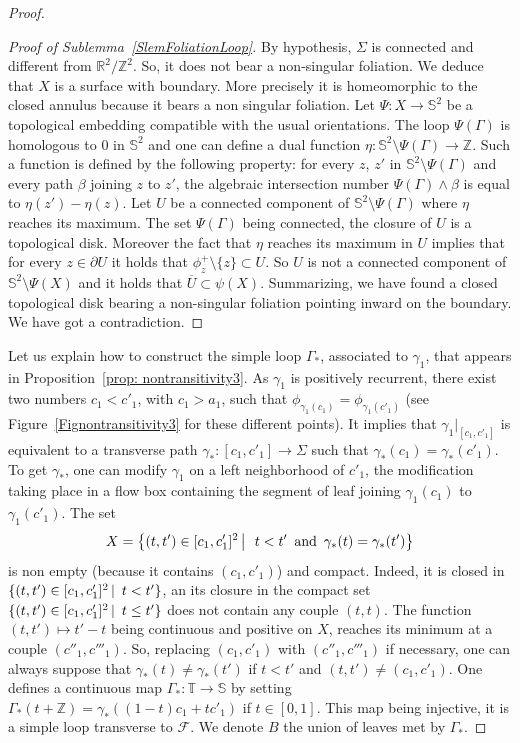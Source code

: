 \documentclass[10pt,a4paper]{article}
\theoremstyle{definition}
\theoremstyle{plain}
\numberwithin{equation}{section}
\numberwithin{figure}{section}
\newcommand{\R}{\mathbb{R}}
\newcommand{\Z}{\mathbb{Z}}
\newcommand{\T}{\mathbb{T}}
\renewcommand{\S}{\mathbb{S}}
\newcommand{\F}{\mathcal{F}}
\begin{document}
\begin{proof}
\begin{proof}[Proof of Sublemma~\ref{SlemFoliationLoop}]
By hypothesis, $\Sigma$ is connected and different from $\R^2/\Z^2$. So, it does not bear a non-singular foliation. We deduce that $X$ is a surface with boundary. More precisely it is homeomorphic to the closed annulus because it bears a non singular foliation. Let $\Psi: X\to\S^2$ be a topological embedding compatible with the usual orientations. The loop $\Psi(\Gamma)$ is homologous to $0$ in $\S^2$ and one can define a dual function $\eta:\S^2\setminus\Psi(\Gamma)\to\Z$. Such a function is defined by the following property: for every $z$, $z'$ in $\S^2\setminus\Psi(\Gamma)$ and every path $\beta$ joining $z$ to $z'$, the algebraic intersection number $\Psi(\Gamma)\wedge \beta$ is equal to $\eta(z')-\eta(z)$. Let $U$ be a connected component of $\S^2\setminus\Psi(\Gamma)$ where $\eta$ reaches its maximum. The set $\Psi(\Gamma)$ being connected, the closure of $U$ is a topological disk. Moreover the fact that $\eta$ reaches its maximum in $U$ implies that for every $z\in \partial U$ it holds that $\phi_z^+\setminus\{z\}\subset U$. So $U$ is not a connected component of $\S^2\setminus \Psi(X)$ and it holds that $\overline U\subset \psi(X)$. Summarizing, we have found a closed topological disk bearing a non-singular foliation pointing inward on the boundary. We have got a contradiction.
\end{proof}



Let us explain how to construct the simple loop $\Gamma_*$, associated to $\gamma_1$, that appears in Proposition~\ref{prop: nontransitivity3}. As $\gamma_1$ is positively recurrent, there exist two numbers $c_1<c'_1$, with $c_1>a_1$, such that $\phi_{\gamma_1(c_1)} = \phi_{\gamma_1(c'_1)}$ (see Figure~\ref{Fignontransitivity3} for these different points). It implies that $\gamma_1\vert_{[c_1,c'_1]}$ is equivalent to a transverse path $\gamma_* :[c_1,c'_1]\to\Sigma $ such that $\gamma_*(c_1) = \gamma_*(c'_1)$. To get $\gamma_*$, one can modify $\gamma_1$ on a left neighborhood of $c'_1$, the modification taking place in a flow box containing the segment of leaf joining $\gamma_1(c_1)$ to $\gamma_1(c'_1)$. The set
\[
X=\big\{(t,t')\in [c_1,c'_1]^2\,\big\vert\, \enskip t<t'\enskip\text{and}\enskip \gamma_*(t) = \gamma_*(t')\big\}
\]
is non empty (because it contains $(c_1,c'_1)$) and compact. Indeed, it is closed in $\{(t,t')\in [c_1,c'_1]^2\,\vert \enskip t<t'\}$, an its closure in the compact set $\{(t,t')\in [c_1,c'_1]^2\,\vert \enskip t\leq t'\}$ does not contain any couple $(t,t)$. The function $(t,t')\mapsto t'-t$ being continuous and positive on $X$, reaches its minimum at a couple $(c''_1,c'''_1)$. So, replacing $(c_1,c'_1)$ with $(c''_1, c'''_1)$ if necessary, one can always suppose that $\gamma_*(t)\not=\gamma_*(t')$ if $t<t'$ and $(t,t')\not=(c_1,c'_1)$. One defines a continuous map $\Gamma_*:\T\to\S$ by setting $\Gamma_*(t+\Z)=\gamma_*((1-t)c_1+tc'_1)$ if $t\in[0,1]$. This map being injective, it is a simple loop transverse to $\F$. We denote $B$ the union of leaves met by $\Gamma_*$.


\end{proof}
\end{document}
